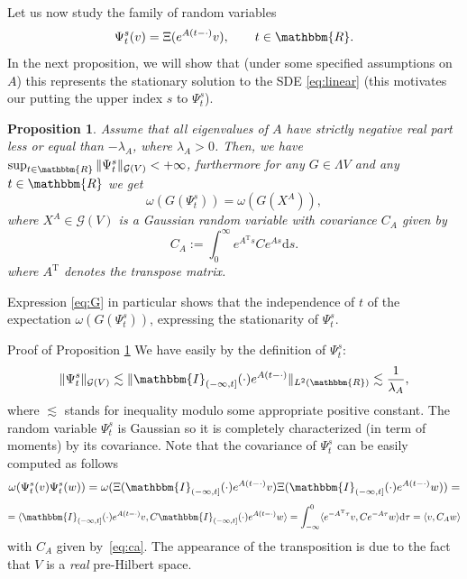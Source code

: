 \documentclass[11pt]{article}
\newcommand{\Tau}{\mathrm{T}}
\newcommand{\assign}{:=}
\newcommand{\mathd}{\mathrm{d}}
\newcommand{\tmtextit}[1]{{\itshape{#1}}}
\newenvironment{proof*}[1]{\noindent\textbf{#1\ }}{\hspace*{\fill}$\Box$\medskip}
\newtheorem{proposition}{Proposition}
{\theorembodyfont{\rmfamily}\newtheorem{remark}{Remark}}
\begin{document}
Let us now study the family of random variables
\[ \Psi_t^s (v) = \Xi (e^{A (t - \cdot)} v), \qquad t \in \mathbbm{R}. \]
In the next proposition, we will show that (under some specified assumptions
on $A$) this represents the stationary solution to the SDE {\eqref{eq:linear}}
(this motivates our putting the upper index $s$ to $\Psi^s_t$).

\begin{proposition}
  \label{proposition_linearlimit}Assume that all eigenvalues of $A$ have
  strictly negative real part less or equal than $- \lambda_A$, where
  $\lambda_A > 0$. Then, we have $\sup_{t \in \mathbbm{R}} \| \Psi^s_t
  \|_{\mathcal{G} (V)} < + \infty$, furthermore for any $G \in \Lambda V$ and
  any $t \in \mathbbm{R}$ we get
  \begin{equation}
    \omega (G (\Psi^s_t)) = \omega (G (X^A)), \label{eq:G}
  \end{equation}
  where $X^A \in \mathcal{G} (V)$ is a Gaussian random variable with
  covariance $C_A$ given by
  \begin{equation}
    C_A \assign \int^{\infty}_0 e^{A^{\Tau} s} C e^{A s} \mathd s.
    \label{eq:ca}
  \end{equation}
  where $A^{\Tau}$ denotes the transpose matrix.
\end{proposition}

\begin{remark}
  Expression {\eqref{eq:G}} in particular shows that the independence of $t$
  of the expectation $\omega (G (\Psi^s_t))$, expressing the stationarity of
  $\Psi^s_t$. 
\end{remark}

\begin{proof*}{Proof of Proposition \ref{proposition_linearlimit}}
  We have easily by the definition of $\Psi^s_t$:
  \[ \| \Psi^s_t \|_{\mathcal{G} (V)} \lesssim \| \mathbbm{I}_{(- \infty, t]}
     (\cdot) e^{A (t - \cdot)} \|_{L^2 (\mathbbm{R})} \lesssim
     \frac{1}{\lambda_A}, \]
  where $\lesssim$ stands for inequality modulo some appropriate positive
  constant. The random variable $\Psi^s_t$ is Gaussian so it is completely
  characterized (in term of moments) by its covariance. Note that the
  covariance of $\Psi_t^s$ can be easily computed as follows
  \[ \omega (\Psi_t^s (v) \Psi_t^s (w)) = \omega (\Xi (\mathbbm{I}_{(- \infty,
     t]} (\cdot) e^{A (t - \cdot)} v) \Xi (\mathbbm{I}_{(- \infty, t]} (\cdot)
     e^{A (t - \cdot)} w)) = \]
  \[ = \langle \mathbbm{I}_{(- \infty, t]} (\cdot) e^{A (t - \cdot)} v,
     C\mathbbm{I}_{(- \infty, t]} (\cdot) e^{A (t - \cdot)} w \rangle =
     \int^0_{- \infty} \langle e^{- A^{\Tau} \tau} v, C e^{- A \tau} w \rangle
     \mathd \tau = \langle v, C_A w \rangle \]
  with $C_A$ given by~{\eqref{eq:ca}}. The appearance of the transposition is
  due to the fact that $V$ is a \tmtextit{real} pre-Hilbert space.
\end{proof*}
\end{document}
